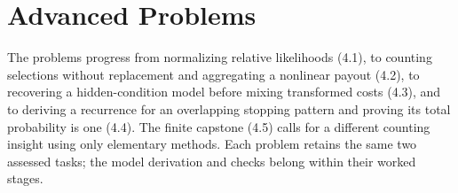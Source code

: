 \section{Advanced Problems}\label{sec:advanced}
The problems progress from normalizing relative likelihoods (4.1), to counting selections without replacement and aggregating a nonlinear payout (4.2), to recovering a hidden-condition model before mixing transformed costs (4.3), and to deriving a recurrence for an overlapping stopping pattern and proving its total probability is one (4.4). The finite capstone (4.5) calls for a different counting insight using only elementary methods. Each problem retains the same two assessed tasks; the model derivation and checks belong within their worked stages.

\clearpage
